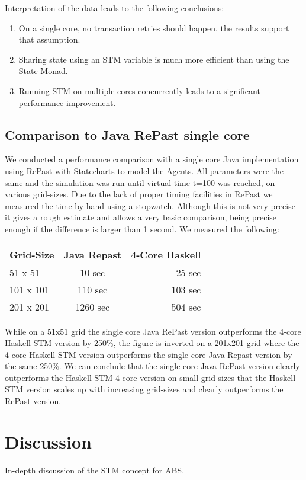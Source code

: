 Interpretation of the data leads to the following conclusions:
\begin{enumerate}
	\item On a single core, no transaction retries should happen, the results support that assumption.
	\item Sharing state using an STM variable is much more efficient than using the State Monad.
	\item Running STM on multiple cores concurrently leads to a significant performance improvement.
\end{enumerate}

\subsection{Comparison to Java RePast single core}
We conducted a performance comparison with a single core Java implementation using RePast with Statecharts to model the Agents. All parameters were the same and the simulation was run until virtual time t=100 was reached, on various grid-sizes. Due to the lack of proper timing facilities in RePast we measured the time by hand using a stopwatch. Although this is not very precise it gives a rough estimate and allows a very basic comparison, being precise enough if the difference is larger than 1 second. We measured the following:

\begin{center}
  \begin{tabular}{ l || c | r }
    Grid-Size & Java Repast & 4-Core Haskell \\ \hline \hline 
    51 x 51 & 10 sec & 25 sec \\ \hline
    101 x 101 & 110 sec & 103 sec \\ \hline
    201 x 201 & 1260 sec & 504 sec \\ \hline
  \end{tabular}
\end{center}

While on a 51x51 grid the single core Java RePast version outperforms the 4-core Haskell STM version by 250\%, the figure is inverted on a 201x201 grid where the 4-core Haskell STM version outperforms the single core Java Repast version by the same 250\%. We can conclude that the single core Java RePast version clearly outperforms the Haskell STM 4-core version on small grid-sizes that the Haskell STM version scales up with increasing grid-sizes and clearly outperforms the RePast version.

\section{Discussion}
\label{sect:stm_discussion}
In-depth discussion of the STM concept for ABS.

